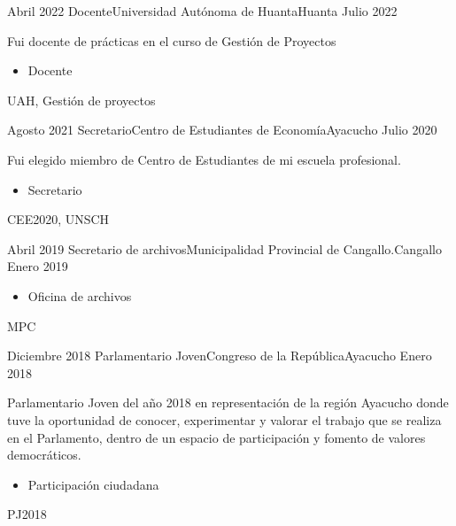 
\begin{experiences}

  \experience
  {Abril 2022}    {Docente}{Universidad Autónoma de Huanta}{Huanta}
  {Julio 2022}   {
  Fui docente de prácticas en el curso de Gestión de Proyectos
                      \begin{itemize}
                        \item Docente   
                      \end{itemize}
                    }
                     {UAH, Gestión de proyectos}
   \emptySeparator
  
   \emptySeparator  

  \experience
  {Agosto 2021}    {Secretario}{Centro de Estudiantes de Economía}{Ayacucho}
  {Julio 2020}   {
                      Fui elegido miembro de Centro de Estudiantes de mi escuela profesional.
                      \begin{itemize}
                        \item Secretario   
                      \end{itemize}
                    }
                     {CEE2020, UNSCH}
   \emptySeparator
  
   \experience
    {Abril 2019} {Secretario de archivos}{Municipalidad Provincial de Cangallo.}{Cangallo}
    {Enero 2019}    {
                      \begin{itemize}
                        \item Oficina de archivos 
                      \end{itemize}
                    }                 
                   {MPC}  
  \emptySeparator
  
  \experience
  {Diciembre 2018}  {Parlamentario Joven}{Congreso de la República}{Ayacucho}
  {Enero 2018}   {
                      Parlamentario Joven del año 2018 en representación de la región Ayacucho donde tuve la oportunidad de conocer, experimentar y valorar el trabajo que se realiza en el Parlamento, dentro de un espacio de participación y fomento de valores democráticos. 
                      \begin{itemize}
                        \item Participación ciudadana                                            
                      \end{itemize}
                  }
                  {PJ2018} 
                  
\end{experiences}



